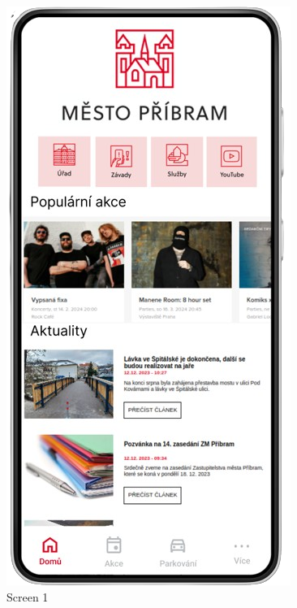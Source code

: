 \begin{figure}[H]
      \includegraphics[width=\linewidth]{screen1.png}
      \caption{Screen 1}\label{fig:screen1}
    \endminipage\hfill

\end{figure}
